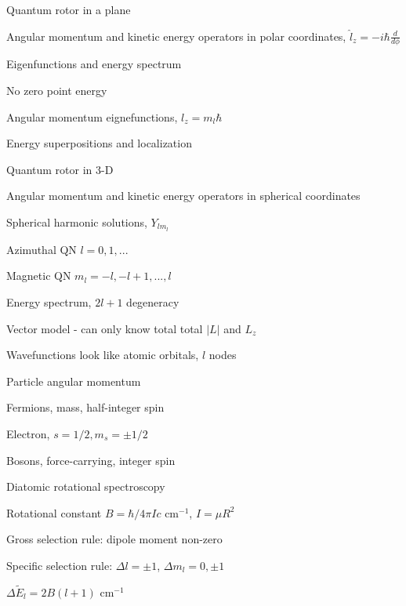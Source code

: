\documentclass[11pt]{article}
\begin{document}
\begin{outline}
\begin{outline}
  \item Quantum rotor in a plane
    \begin{outline}
    \item Angular momentum and kinetic energy operators in polar coordinates,
      $\hat l_z = -i\hbar \frac{d}{d\phi}$
    \item Eigenfunctions and energy spectrum
    \item No zero point energy
    \item Angular momentum eignefunctions, $l_z = m_l \hbar$
      \item Energy superpositions and localization 
    \end{outline}
  \item Quantum rotor in 3-D
    \begin{outline}
    \item Angular momentum and kinetic energy operators in spherical coordinates
    \item Spherical harmonic solutions, $Y_{lm_l}$
    \item Azimuthal QN $l=0, 1, ...$
    \item Magnetic QN $m_l = -l, -l+1, ..., l$
    \item Energy spectrum, $2 l + 1$ degeneracy
    \item Vector model - can only know total total $|L|$ and $L_z$
    \item Wavefunctions look like atomic orbitals, $l$ nodes
    \end{outline}
  \item Particle angular momentum
    \begin{outline}
    \item Fermions, mass, half-integer spin
      \begin{outline}
      \item Electron, $s=1/2, m_s=\pm 1/2$
      \end{outline}
    \item Bosons, force-carrying, integer spin
    \end{outline}
  \item{Diatomic rotational spectroscopy}
    \begin{outline}
    \item Rotational constant $B = \hbar/4\pi I c$ cm$^{-1}$, $I=\mu R^2$
    \item Gross selection rule: dipole moment non-zero
    \item Specific selection rule: $\Delta l=\pm 1$, $\Delta m_l=0, \pm1$
    \item $\Delta \tilde E_l  = 2B(l+1)$ cm$^{-1}$

\end{outline}
\end{outline}
\end{outline}
\end{document}
